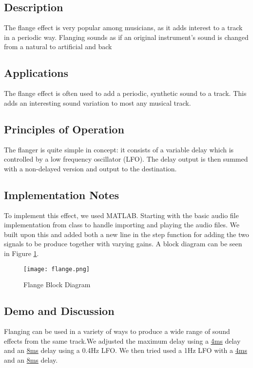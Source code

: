 \subsection{Description}
The flange effect is very popular among musicians, as it adds interest to a track in a periodic way. Flanging sounds as if an original instrument's sound is changed from a natural to artificial and back 

\subsection{Applications}
The flange effect is often used to add a periodic, synthetic sound to a track. This adds an interesting sound variation to most any musical track.

\subsection{Principles of Operation}
The flanger is quite simple in concept: it consists of a variable delay which is controlled by a low frequency oscillator (LFO). The delay output is then summed with a non-delayed version and output to the destination.

\subsection{Implementation Notes}
To implement this effect, we used MATLAB. Starting with the basic audio file implementation from class to handle importing and playing the audio files. We built upon this and added both a new line in the step function for adding the two signals to be produce together with varying gains. A block diagram can be seen in Figure \ref{fig:flange-block-diagram}.
\begin{figure}[ht]
	\centering
	\texttt{[image: flange.png]}
	\caption{Flange Block Diagram}
	\label{fig:flange-block-diagram}
\end{figure}

\subsection{Demo and Discussion}
Flanging can be used in a variety of ways to produce a wide range of sound effects from the same track.We adjusted the maximum delay using a 
\href{run:../OutputAudio/flange_22-004 Original Guitar_{freq0.4Hz}{delay_max=4ms}.wav}{4ms} 
delay and an 
\href{run:../OutputAudio/flange_22-004 Original Guitar_{freq=0.4Hz}{delay_max=8ms}.wav}{8ms}
 delay using a 0.4Hz LFO. We then tried used a 1Hz LFO with a 
\href{run:../OutputAudio/flange_22-004 Original Guitar_{freq=1Hz}{delay_max=4ms}.wav}{4ms} 
and an 
\href{run:../OutputAudio/flange_22-004 Original Guitar_{freq=1Hz}{delay_max=8ms}.wav}{8ms}
delay.

